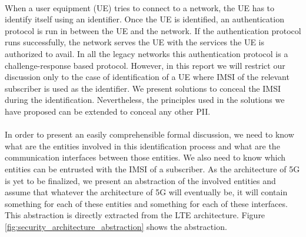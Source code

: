 \documentclass[lnicst,sechang,a4paper]{svmultln}
\begin{document}
\paragraph{}
When a user equipment (UE) tries to connect to a network, the UE has to identify itself using an identifier. Once the UE is identified, an authentication protocol is run in between the UE and the network. If the authentication protocol runs successfully, the network serves the UE with the services the UE is authorized to avail. In all the legacy networks this authentication protocol is a challenge-response based protocol. However, in this report we will restrict our discussion only to the case of identification of a UE where IMSI of the relevant subscriber is used as the identifier. We present solutions to conceal the IMSI during the identification. Nevertheless, the principles used in the solutions we have proposed can be extended to conceal any other PII. 
\paragraph{}
In order to present an easily comprehensible formal discussion, we need to know what are the entities involved in this identification process and what are the communication interfaces between those entities. We also need to know which entities can be entrusted with the IMSI of a subscriber. As the architecture of 5G is yet to be finalized, we present an abstraction of the involved entities and assume that whatever the architecture of 5G will eventually be, it will contain something for each of these entities and something for each of these interfaces. This abstraction is directly extracted from the LTE architecture. Figure \ref{fig:security_architecture_abstraction} shows the abstraction.
\end{document}
